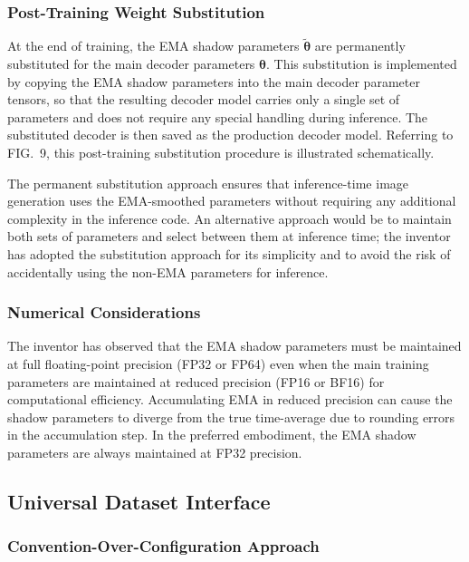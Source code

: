 \documentclass[12pt,letterpaper]{article}
\newcommand{\btheta}{\bm{\theta}}
\begin{document}
\subsubsection{Post-Training Weight Substitution}

At the end of training, the EMA shadow parameters $\tilde{\btheta}$ are
permanently substituted for the main decoder parameters $\btheta$. This
substitution is implemented by copying the EMA shadow parameters into the main
decoder parameter tensors, so that the resulting decoder model carries only a
single set of parameters and does not require any special handling during
inference. The substituted decoder is then saved as the production decoder
model. Referring to FIG.\ 9, this post-training substitution procedure is
illustrated schematically.

The permanent substitution approach ensures that inference-time image generation
uses the EMA-smoothed parameters without requiring any additional complexity in
the inference code. An alternative approach would be to maintain both sets of
parameters and select between them at inference time; the inventor has adopted
the substitution approach for its simplicity and to avoid the risk of
accidentally using the non-EMA parameters for inference.

\subsubsection{Numerical Considerations}

The inventor has observed that the EMA shadow parameters must be maintained at
full floating-point precision (FP32 or FP64) even when the main training
parameters are maintained at reduced precision (FP16 or BF16) for computational
efficiency. Accumulating EMA in reduced precision can cause the shadow
parameters to diverge from the true time-average due to rounding errors in
the accumulation step. In the preferred embodiment, the EMA shadow parameters
are always maintained at FP32 precision.

\subsection{Universal Dataset Interface}

\subsubsection{Convention-Over-Configuration Approach}
\end{document}
